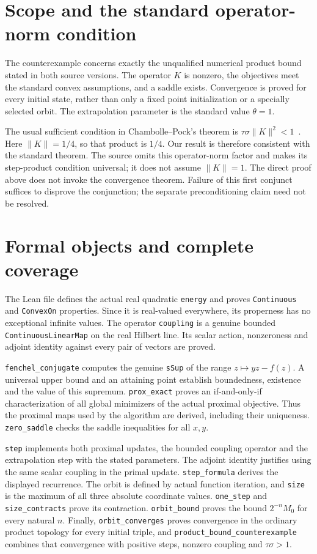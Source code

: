 \documentclass[11pt]{article}
\begin{document}
\newpage
\section*{Scope and the standard operator-norm condition}
The counterexample concerns exactly the unqualified numerical product
bound stated in both source versions. The operator $K$ is nonzero, the
objectives meet the standard convex assumptions, and a saddle exists.
Convergence is proved for every initial state, rather than only a fixed
point initialization or a specially selected orbit. The extrapolation
parameter is the standard value $\theta=1$.

The usual sufficient condition in Chambolle--Pock's theorem is
$\tau\sigma\|K\|^2<1$~\cite{CP}. Here $\|K\|=1/4$, so that product
is $1/4$. Our result is therefore consistent with the standard theorem.
The source omits this operator-norm factor and makes its step-product
condition universal; it does not assume $\|K\|=1$. The direct proof above
does not invoke the convergence theorem. Failure of this first conjunct
suffices to disprove the conjunction; the separate preconditioning claim
need not be resolved.

\section*{Formal objects and complete coverage}
The Lean file defines the actual real quadratic \texttt{energy} and
proves \texttt{Continuous} and \texttt{ConvexOn} properties.
Since it is real-valued everywhere, its properness has no exceptional
infinite values. The operator \texttt{coupling} is a genuine bounded
\texttt{ContinuousLinearMap} on the real Hilbert line. Its scalar action,
nonzeroness and adjoint identity against every pair of vectors are proved.

\texttt{fenchel\_conjugate} computes the genuine \texttt{sSup} of the
range $z\mapsto yz-f(z)$. A universal upper bound and an attaining point
establish boundedness, existence and the value of this supremum.
\texttt{prox\_exact} proves an if-and-only-if characterization of all
global minimizers of the actual proximal objective. Thus the proximal
maps used by the algorithm are derived, including their uniqueness.
\texttt{zero\_saddle} checks the saddle inequalities for all $x,y$.

\texttt{step} implements both proximal updates, the bounded coupling
operator and the extrapolation step with the stated parameters. The
adjoint identity justifies using the same scalar coupling in the primal
update. \texttt{step\_formula} derives the displayed recurrence.
The orbit is defined by actual function iteration, and \texttt{size} is
the maximum of all three absolute coordinate values.
\texttt{one\_step} and \texttt{size\_contracts} prove its contraction.
\texttt{orbit\_bound} proves the bound $2^{-n}M_0$ for every natural $n$.
Finally, \texttt{orbit\_converges} proves convergence in the ordinary
product topology for every initial triple, and
\texttt{product\_bound\_counterexample} combines that convergence with
positive steps, nonzero coupling and $\tau\sigma>1$.
\end{document}
